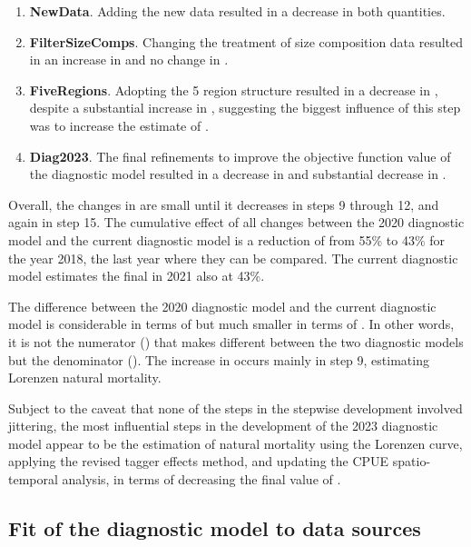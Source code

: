 \begin{enumerate}
  \item \textbf{NewData}. Adding the new data resulted in a decrease in both quantities.

  \item \textbf{FilterSizeComps}. Changing the treatment of size composition data resulted in an increase in \sbsbfo and no change in \sb.

  \item \textbf{FiveRegions}. Adopting the 5 region structure resulted in a decrease in \sbsbfo, despite a substantial increase in \sb, suggesting the biggest influence of this step was to increase the estimate of \sbfo.

  \item \textbf{Diag2023}. The final refinements to improve the objective function value of the diagnostic model resulted in a decrease in \sbsbfo and substantial decrease in \sb.

\end{enumerate}

Overall, the changes in \sbsbfo are small until it decreases in steps 9 through 12, and again in step 15. The cumulative effect of all changes between the 2020 diagnostic model and the current diagnostic model is a reduction of \sbsbfo from 55\% to 43\% for the year 2018, the last year where they can be compared. The current diagnostic model estimates the final \sbsbfo in 2021 also at 43\%.

The difference between the 2020 diagnostic model and the current diagnostic model is considerable in terms of \sbsbfo but much smaller in terms of \sb. In other words, it is not the numerator (\sb) that makes \sbsbfo different between the two diagnostic models but the denominator (\sbfo). The increase in \sbfo occurs mainly in step 9, estimating Lorenzen natural mortality.

Subject to the caveat that none of the steps in the stepwise development involved jittering, the most influential steps in the development of the 2023 diagnostic model appear to be the estimation of natural mortality using the Lorenzen curve, applying the revised tagger effects method, and updating the CPUE spatio-temporal analysis, in terms of decreasing the final value of \sbsbfo.

\subsection{Fit of the diagnostic model to data sources}
\label{sec:fit_diag}

